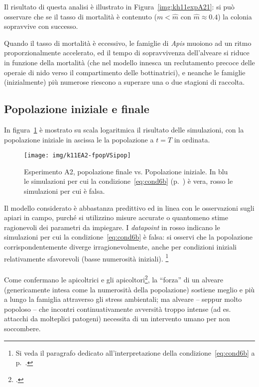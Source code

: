 Il risultato di questa analisi è illustrato in Figura~\ref{img:kh11expA21}: si può osservare che se il tasso di mortalità
è contenuto ($m< \hat{m}$ con $\hat{m} \approx 0.4$) la colonia sopravvive con successo.

Quando il tasso di mortalità è eccessivo, le famiglie di \emph{Apis} muoiono ad un ritmo proporzionalmente accelerato, ed
il tempo di sopravvivenza dell'alveare si riduce in funzione della mortalità (che nel modello innesca un reclutamento
precoce delle operaie di nido verso il compartimento delle bottinatrici), e neanche le famiglie (inizialmente) più numerose
riescono a superare una o due stagioni di raccolta.


\subsection{Popolazione iniziale e finale}
In figura~\ref{img:kh11expA22} è mostrato su scala logaritmica il risultato delle simulazioni, con la popolazione
iniziale in ascissa le la popolazione a $t=T$ in ordinata.
\begin{figure}[hbt]
    \centering
    \texttt{[image: img/k11EA2-fpopVSipop]}

    \caption[Esperimento A2, popolazione finale vs. Popolazione iniziale.]{Esperimento A2, popolazione finale vs.
    Popolazione iniziale. In blu le simulazioni per cui la condizione~\eqref{eq:cond6b} (p.~\pageref{eq:cond6b}) è vera,
    rosso le simulazioni per cui è falsa.}

    \label{img:kh11expA22}
\end{figure}

Il modello considerato è abbastanza predittivo ed in linea con le osservazioni sugli apiari in campo, purché si
utilizzino misure accurate o quantomeno stime ragionevoli dei parametri da impiegare.
I \emph{datapoint} in rosso indicano le simulazioni per cui la condizione~\eqref{eq:cond6b} è falsa: si
osservi che la popolazione corrispondentemente diverge irragionevolmente, anche per condizioni iniziali
relativamente sfavorevoli (\ie basse numerosità iniziali).
\footnote{Si veda il paragrafo dedicato all'interpretazione della condizione~\eqref{eq:cond6b}
a p.~\pageref{par:interpretationCond6b}.}

\paragraph{}
Come confermano le apicoltrici e gli apicoltori\footcite{privFDL,privFPan,meccanica},
la ``forza'' di un alveare (genericamente intesa come la numerosità della popolazione)
sostiene meglio e più a lungo la famiglia attraverso gli stress ambientali;
ma alveare -- seppur molto popoloso -- che incontri continuativamente avversità troppo intense (ad es. attacchi da
molteplici patogeni) necessita di un intervento umano per non soccombere.

